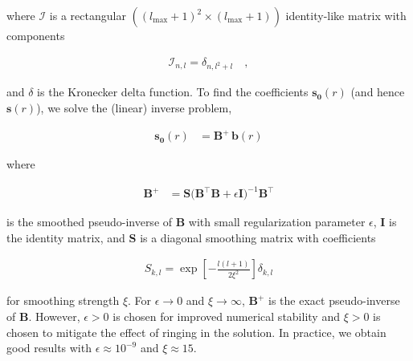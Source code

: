 \documentclass[modern,linenumbers]{aastex62}
\begin{document}
%
where $\pmb{\mathcal{I}}$ is a rectangular
$\left( \left(l_\mathrm{max} + 1\right)^2 \times \left(l_\mathrm{max} + 1\right) \right)$
identity-like matrix with components
%
\begin{linenomath}\begin{align}
        \mathcal{I}_{n, l} = \delta_{n, l^2 + l}
        \quad,
    \end{align}\end{linenomath}
%
and $\delta$ is the Kronecker delta function.
To find the coefficients $\mathbf{s_0}(r)$
(and hence $\mathbf{s}(r)$), we solve the (linear) inverse problem,
%
\begin{linenomath}\begin{align}
        \mathbf{s_0}(r) & = \mathbf{B}^+ \, \mathbf{b}(r)
    \end{align}\end{linenomath}
%
%
where
%
\begin{linenomath}\begin{align}
        \mathbf{B}^+ & = \mathbf{S} \Big(\mathbf{B}^\top \mathbf{B} +
        \epsilon \mathbf{I}\Big)^{-1} \mathbf{B}^\top
    \end{align}\end{linenomath}
%
is the smoothed pseudo-inverse of $\mathbf{B}$ with small regularization
parameter $\epsilon$, $\mathbf{I}$ is the identity matrix, and
$\mathbf{S}$ is a diagonal smoothing matrix with coefficients
%
\begin{linenomath}\begin{align}
        S_{k,l} = \exp\left[-\frac{l(l + 1)}{2\xi^2}\right] \delta_{k,l}
    \end{align}\end{linenomath}
%
for smoothing strength $\xi$. For $\epsilon \rightarrow 0$ and
$\xi \rightarrow \infty$,
$\mathbf{B}^+$ is the exact pseudo-inverse of
$\mathbf{B}$. However,
$\epsilon > 0$ is chosen for improved numerical stability and
$\xi > 0$ is chosen to mitigate the effect of ringing in the solution.
In practice, we obtain good results with $\epsilon \approx 10^{-9}$
and $\xi \approx 15$.
\end{document}
